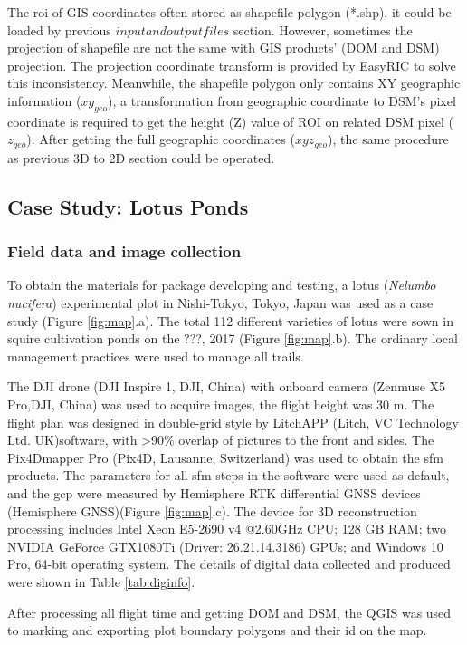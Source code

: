 \documentclass{configs/bmcart}
\begin{document}
The \acrshort*{roi} of GIS coordinates often stored as shapefile polygon (*.shp), it could be loaded by previous $input and output files$ section. However, sometimes the projection of shapefile are not the same with GIS products' (DOM and DSM) projection. The projection coordinate transform is provided by EasyRIC to solve this inconsistency. Meanwhile, the shapefile polygon only contains XY geographic information ($xy_{geo}$), a transformation from geographic coordinate to DSM's pixel coordinate is required to get the height (Z) value of ROI on related DSM pixel ($z_{geo}$). After getting the full geographic coordinates ($xyz_{geo}$), the same procedure as previous 3D to 2D section could be operated.

\subsection*{Case Study: Lotus Ponds}

\subsubsection*{Field data and image collection}
To obtain the materials for package developing and testing, a lotus (\textit{Nelumbo nucifera}) experimental plot in Nishi-Tokyo, Tokyo, Japan was used as a case study (Figure \ref{fig:map}.a). The total 112 different varieties of lotus were sown in squire cultivation ponds on the ???, 2017 (Figure \ref{fig:map}.b). The ordinary local management practices were used to manage all trails.

The DJI drone (DJI Inspire 1, DJI, China) with onboard camera (Zenmuse X5 Pro,DJI, China) was used to acquire images, the flight height was 30 m. The flight plan was designed in double-grid style by LitchAPP (Litch, VC Technology Ltd. UK)software, with >90\% overlap of pictures to the front and sides. The Pix4Dmapper Pro  (Pix4D, Lausanne, Switzerland) was used to obtain the \acrshort*{sfm} products. The parameters for all \acrshort*{sfm} steps in the software were used as default, and the \acrfull*{gcp} were measured by Hemisphere RTK differential GNSS devices (Hemisphere GNSS)(Figure \ref{fig:map}.c). The device for 3D reconstruction processing includes Intel Xeon E5-2690 v4 @2.60GHz CPU; 128 GB RAM; two NVIDIA GeForce GTX1080Ti (Driver: 26.21.14.3186) GPUs; and Windows 10 Pro, 64-bit operating system. The details of digital data collected and produced were shown in Table \ref{tab:diginfo}.

After processing all flight time and getting DOM and DSM, the QGIS was used to marking and exporting plot boundary polygons and their id on the map.
\end{document}
